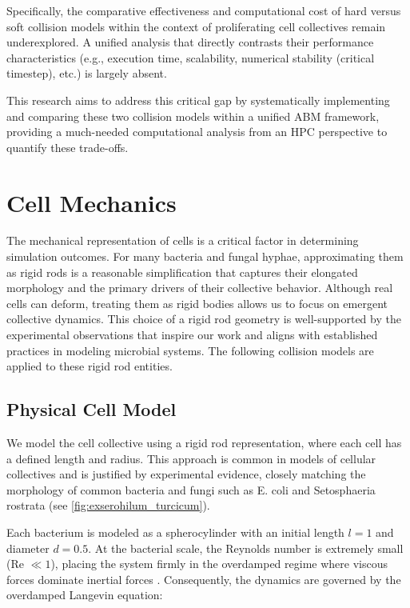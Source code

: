 \documentclass[conference]{IEEEtran}
\begin{document}
Specifically, the comparative effectiveness and computational cost of hard versus soft collision models within the context of proliferating cell collectives remain underexplored. A unified analysis that directly contrasts their performance characteristics (e.g., execution time, scalability, numerical stability (critical timestep), etc.) is largely absent.

This research aims to address this critical gap by systematically implementing and comparing these two collision models within a unified ABM framework, providing a much-needed computational analysis from an HPC perspective to quantify these trade-offs.

\section{Cell Mechanics}

The mechanical representation of cells is a critical factor in determining simulation outcomes. For many bacteria and fungal hyphae, approximating them as rigid rods is a reasonable simplification that captures their elongated morphology and the primary drivers of their collective behavior. Although real cells can deform, treating them as rigid bodies allows us to focus on emergent collective dynamics. This choice of a rigid rod geometry is well-supported by the experimental observations that inspire our work and aligns with established practices in modeling microbial systems. The following collision models are applied to these rigid rod entities.

\subsection{Physical Cell Model}

We model the cell collective using a rigid rod representation, where each cell has a defined length and radius. This approach is common in models of cellular collectives \cite{You2018, Weady2024, Blanchard2015, Warren2019, Ghosh2015} and is justified by experimental evidence, closely matching the morphology of common bacteria and fungi such as E. coli and Setosphaeria rostrata (see \autoref{fig:exserohilum_turcicum}).

Each bacterium is modeled as a spherocylinder with an initial length $l = 1$ and diameter $d = 0.5$. At the bacterial scale, the Reynolds number is extremely small (Re $\ll 1$), placing the system firmly in the overdamped regime where viscous forces dominate inertial forces \cite{datta2024lifelowreynoldsnumber}. Consequently, the dynamics are governed by the overdamped Langevin equation:
\end{document}

